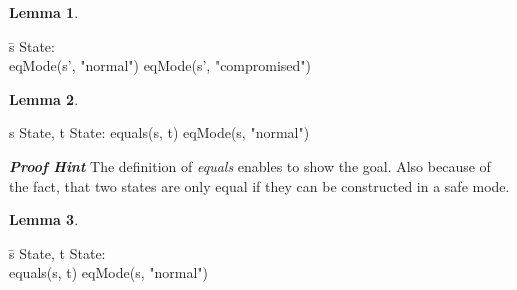 \documentclass[conference]{IEEEtran}
\newtheorem{lem}{Lemma}
\begin{document}
\begin{lem} \end{lem} 
\begin{tabbing}
 \=s  State: \\\> eqMode(s', "normal")  eqMode(s', "compromised")\end{tabbing}
\begin{lem}\end{lem} \begin{tabbing}  s  State, t  State: equals(s, t)  eqMode(s, "normal")\end{tabbing}
\textbf{\em Proof Hint}
The definition of \emph{equals} enables to show the goal. Also because of the fact, that two states are only equal if they can be constructed in a safe mode.
\begin{lem} \end{lem}

\begin{tabbing}  \=s  State, t  State: \\\> equals(s, t)   eqMode(s, "normal") \end{tabbing}
\end{document}
